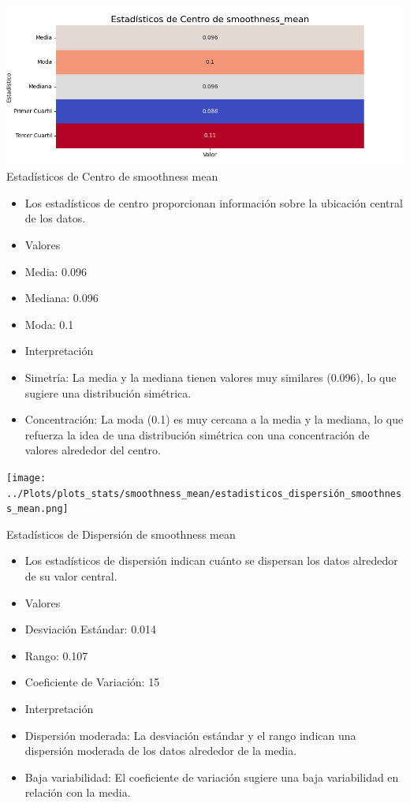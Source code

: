 \documentclass[a4paper, 12pt]{article}
\begin{document}
\includegraphics[width=\textwidth]{../Plots/plots_stats/smoothness_mean/estadisticas_centro_smoothness_mean.png}
Estadísticos de Centro de smoothness mean
\begin{itemize}
\item Los estadísticos de centro proporcionan información sobre la ubicación central de los datos.

\item Valores

\item Media: 0.096
\item Mediana: 0.096
\item Moda: 0.1
\item Interpretación

\item Simetría: La media y la mediana tienen valores muy similares (0.096), lo que sugiere una distribución simétrica.
\item Concentración: La moda (0.1) es muy cercana a la media y la mediana, lo que refuerza la idea de una distribución simétrica con una concentración de valores alrededor del centro.
\end{itemize}


\texttt{[image: ../Plots/plots\_stats/smoothness\_mean/estadisticos\_dispersión\_smoothness\_mean.png]}

Estadísticos de Dispersión de smoothness mean
\begin{itemize}
\item Los estadísticos de dispersión indican cuánto se dispersan los datos alrededor de su valor central.

\item Valores

\item Desviación Estándar: 0.014
\item Rango: 0.107
\item Coeficiente de Variación: 15%
\item Interpretación

\item Dispersión moderada: La desviación estándar y el rango indican una dispersión moderada de los datos alrededor de la media.
\item Baja variabilidad: El coeficiente de variación sugiere una baja variabilidad en relación con la media.
\end{itemize}
\end{document}
